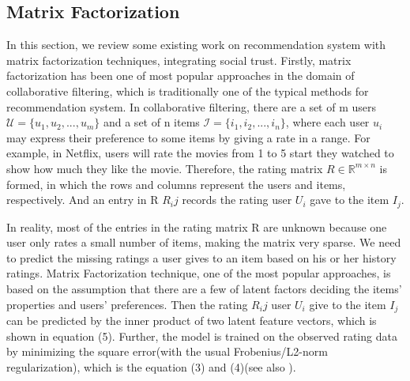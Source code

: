 \documentclass[10pt,onecolumn,conference]{IEEEtran}
\begin{document}
\subsection{Matrix Factorization}
In this section, we review some existing work on recommendation system with matrix factorization techniques, integrating social trust. Firstly, matrix factorization has been one of most popular approaches in the domain of collaborative filtering, which is traditionally one of the typical methods for recommendation system. In collaborative filtering, there are a set of m users $\mathcal{U} = \{u_1,u_2,...,u_m\}$ and a set of n items $\mathcal{I} = \{i_1,i_2,...,i_n\}$, where each user $u_i$ may express their preference to some items by giving a rate in a range. For example, in Netflix, users will rate the movies from 1 to 5 start they watched to show how much they like the movie. Therefore, the rating matrix $R \in \mathbb{R}^{m \times n}$ is formed, in which the rows and columns represent the users and items, respectively. And an entry in R $R_ij$ records the rating user $U_i$ gave to the item $I_j$. 

In reality, most of the entries in the rating matrix R are unknown because one user only rates a small number of items, making the matrix very sparse. We need to predict the missing ratings a user gives to an item based on his or her history ratings. Matrix Factorization technique, one of the most popular approaches, is based on the assumption that there are a few of latent factors deciding the items' properties and users' preferences. Then the rating $R_ij$ user $U_i$ give to the item $I_j$ can be predicted by the inner product of two latent feature vectors, which is shown in equation (5). Further, the model is trained on the observed rating data by minimizing the square error(with the usual Frobenius/L2-norm regularization), which is the equation (3) and (4)(see also \cite{koren2009matrix}).
\end{document}
